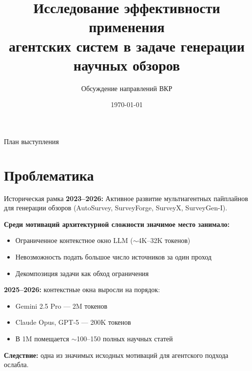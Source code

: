 \documentclass[10pt,aspectratio=169]{beamer}
\title[Агентские системы для генерации обзоров]{Исследование эффективности применения\\агентских систем в задаче генерации научных обзоров}
\subtitle{Обсуждение направлений ВКР}
\author{}
\institute{CMC MSU}
\date{\today}
\begin{document}
\begin{frame}
  \titlepage
\end{frame}

\begin{frame}{План выступления}
  \tableofcontents
\end{frame}

\section{Проблематика}

\begin{frame}{Историческая рамка}
  \textbf{2023--2026:} Активное развитие мультиагентных пайплайнов для генерации обзоров (AutoSurvey, SurveyForge, SurveyX, SurveyGen-I).

  \vspace{0.3cm}
  \textbf{Среди мотиваций архитектурной сложности значимое место занимало:}
  \begin{itemize}
    \item Ограниченное контекстное окно LLM ($\sim$4K--32K токенов)
    \item Невозможность подать большое число источников за один проход
    \item Декомпозиция задачи как обход ограничения
  \end{itemize}

  \vspace{0.3cm}
  \textbf{2025--2026:} контекстные окна выросли на порядок:
  \begin{itemize}
    \item Gemini 2.5 Pro --- 2M токенов
    \item Claude Opus, GPT-5 --- 200K токенов
    \item В 1M помещается $\sim$100--150 полных научных статей
  \end{itemize}

  \vspace{0.3cm}
  \textbf{Следствие:} одна из значимых исходных мотиваций для агентского подхода ослабла.
\end{frame}
\end{document}

